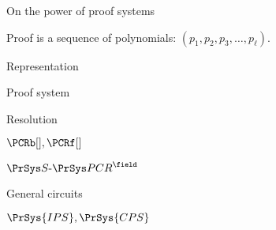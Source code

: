 \begin{frame}{On the power of proof systems}

    Proof is a sequence of polynomials: $(p_1, p_2, p_3, \dots, p_{\ell})$.

    \vspace{0.3cm}
    
    \def\ls{0.68}
    \def\rs{0.28}

    \begin{minipage}{\ls\linewidth}
        \centering
        Representation
    \end{minipage}
    \begin{minipage}{\rs\linewidth}
        \centering
        Proof system
    \end{minipage}

    \vspace{0.1cm}
    \pause
    \begin{minipage}{\ls\linewidth}
        \centering
        
    \end{minipage}
    \begin{minipage}{\rs\linewidth}
        \centering
        Resolution
    \end{minipage}

    \vspace{0.1cm}
    \pause
    
    \begin{minipage}{\ls\linewidth}
        \centering
        
    \end{minipage}
    \begin{minipage}{\rs\linewidth}
        \centering
        $\PCRb[], \PCRf[]$
    \end{minipage}

    \vspace{0.1cm}
    \pause

    \begin{minipage}{\ls\linewidth}
        \centering
        
    \end{minipage}
    \begin{minipage}{\rs\linewidth}
        \centering
        $\SPCR^{\field}$
    \end{minipage}

    \vspace{0.1cm}
    \pause

    \begin{minipage}{\ls\linewidth}
        \centering
        General circuits
    \end{minipage}
    \begin{minipage}{\rs\linewidth}
        \centering
        $\PrSys{IPS}, \PrSys{CPS}$
    \end{minipage}
    
\end{frame}


